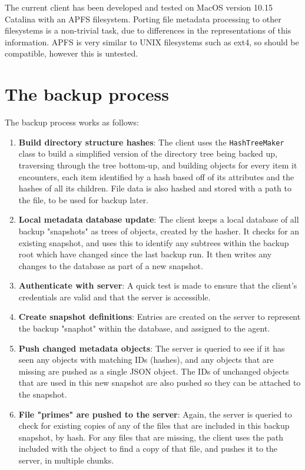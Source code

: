 \documentclass[bsc,frontabs,twoside,singlespacing,parskip,deptreport]{infthesis}     %
\begin{document}
The current client has been developed and tested on MacOS version 10.15 Catalina with an APFS
filesystem. Porting file metadata processing to other filesystems is a non-trivial task, due 
to differences in the representations of this information. APFS is very similar to UNIX 
filesystems such as ext4, so should be compatible, however this is untested.

\section{The backup process}

The backup process works as follows:

\begin{enumerate}
	\item \textbf{Build directory structure hashes}:
	The client uses the \texttt{HashTreeMaker} class to build a simplified version of the 
	directory tree being backed up, traversing through the tree bottom-up, and building objects
	for every item it encounters, each item identified by a hash based off of its attributes
	and the hashes of all its children. File data is also hashed and stored with a path to the
	file, to be used for backup later.
	
	\item \textbf{Local metadata database update}:
	The client keeps a local database of all backup "snapshots" as trees of objects, created by
	the hasher. It checks for an existing snapshot, and uses this to identify any subtrees within
	the backup root which have changed since the last backup run. It then writes any changes to
	the database as part of a new snapshot.
	
	\item \textbf{Authenticate with server}:
	A quick test is made to ensure that the client's credentials are valid and that the server is
	accessible.
	
	\item \textbf{Create snapshot definitions}:
	Entries are created on the server to represent the backup "snaphot" within the database, and
	assigned to the agent.
	
	\item \textbf{Push changed metadata objects}:
	The server is queried to see if it has seen any objects with matching IDs (hashes), and any
	objects that are missing are pushed as a single JSON object. The IDs of unchanged objects
	that are used in this new snapshot are also pushed so they can be attached to the snapshot.
	
	\item \textbf{File "primes" are pushed to the server}:
	Again, the server is queried to check for existing copies of any of the files that are 
	included in this backup snapshot, by hash. For any files that are missing, the client uses
	the path included with the object to find a copy of that file, and pushes it to the server,
	in multiple chunks.
\end{enumerate}
\end{document}
